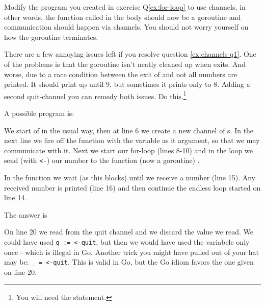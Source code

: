 \begin{Exercise}[title={Channels},difficulty=4]
\label{ex:channels}
\Question\label{ex:channels q1} Modify the program you created in
exercise Q\ref{ex:for-loop}
to use channels, in other words, the function called in the body
should now be a goroutine and communication should happen via
channels. You should not worry yourself on how the goroutine
terminates.

\Question\label{ex:channels q2} There are a few annoying issues left if
you resolve question \ref{ex:channels q1}. One of the problems is
that the goroutine isn't neatly cleaned up when 
exits. And worse, due to a race condition between the exit of 
 and  not all numbers are printed.
It should print up until 9, but sometimes it prints only to 8. Adding
a second quit-channel you can remedy both issues. Do this.\footnote{You
will need the  statement.}

\end{Exercise}

\begin{Answer}
\Question A possible program is: 

We start of in the usual way, then at line 6 we create a new channel of
s. In the next line we fire off the function  with
the  variable as it argument, so that we may communicate with
it. Next we start our for-loop (lines 8-10) and in the loop
we send (with \lstinline{<-}) our number to the function (now a goroutine) .

In the function  we wait (as this blocks) until we receive a number (line
15). Any received number is printed (line 16) and then continue the endless loop
started on line 14.

\Question The answer is

On line 20 we read from the quit channel and we discard the value we
read. We could have used \lstinline{q := <-quit}, but then we would have used
the variabele only once - which is illegal in Go. Another trick you
might have pulled out of your hat may be: \lstinline{_ = <-quit}. This is
valid in Go, but the Go idiom favors the one given on line 20.
\end{Answer}
